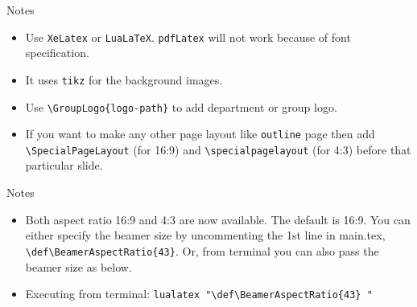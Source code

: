 \begin{frame}[fragile]{Notes}
    \begin{itemize}
        \item Use \verb|XeLatex| or \verb|LuaLaTeX|. \verb|pdfLatex| will not work because of font specification.
        \item It uses \verb|tikz| for the background images.
        \item Use \verb|\GroupLogo{logo-path}| to add department or group logo.
        \item If you want to make any other page layout like \verb|outline| page then add \verb|\SpecialPageLayout| (for 16:9) and \verb|\specialpagelayout| (for 4:3) before that particular slide.
    \end{itemize}
\end{frame}

\begin{frame}[fragile]{Notes}
    \begin{itemize}
        \item Both aspect ratio 16:9 and 4:3 are now available. The default is 16:9. You can either specify the beamer size by uncommenting the 1st line in main.tex, \verb|\def\BeamerAspectRatio{43}|. Or, from terminal you can also pass the beamer size as below.
        \item Executing from terminal: \verb|lualatex "\def\BeamerAspectRatio{43} "|
    \end{itemize}
\end{frame}